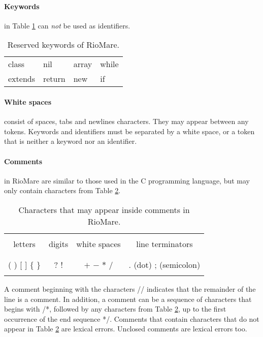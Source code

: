 \documentclass{article}
\begin{document}
\paragraph{Keywords} in Table \ref{Table_Reserved_Keywords_of_RioMare} can \textit{not}
be used as identifiers.
\begin{table}[h]
\centering
\begin{tabular}{ l l l l}
class   & nil    & array  & while \\
extends & return & new    & if    \\
\end{tabular}
\caption{
Reserved keywords of RioMare.
\label{Table_Reserved_Keywords_of_RioMare}}
\end{table}
\paragraph{White spaces} consist of spaces, tabs and newlines characters.
They may appear between any tokens.
Keywords and identifiers must be separated by a white space,
or a token that is neither a keyword nor an identifier.
\paragraph{Comments} in RioMare are similar to those used in the C programming language,
but may only contain characters from Table \ref{Table_Characters_That _May_Appear_inside_Comments}.
\begin{table}[h]
\centering
\begin{tabular}{ | c | c | c | c | }
\hline
        &        &              &                  \\
letters & digits & white spaces & line terminators \\
        &        &              &                  \\
\hline
                  &     &                 &                       \\
( ) [ ] $\{$ $\}$ & ? ! & $+$ $-$ $*$ $/$ & . (dot) ; (semicolon) \\
                  &     &                 &                       \\
\hline
\end{tabular}
\caption{
Characters that may appear inside comments in RioMare.
\label{Table_Characters_That _May_Appear_inside_Comments}}
\end{table}
A comment beginning with the characters // indicates that the remainder of the line is a comment.
In addition, a comment can be a sequence of characters that begins with /*,
followed by any characters from Table \ref{Table_Characters_That _May_Appear_inside_Comments},
up to the first occurrence of the end sequence */.
Comments that contain characters that do not appear in Table
\ref{Table_Characters_That _May_Appear_inside_Comments} are lexical errors.
Unclosed comments are lexical errors too.
\end{document}
